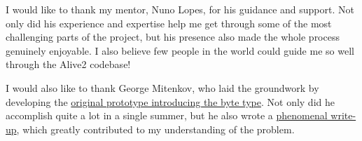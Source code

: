 \documentclass[a4paper,12pt]{article}
\begin{document}
I would like to thank my mentor, Nuno Lopes, for his guidance and support.
Not only did his experience and expertise help me get through some of the most challenging parts of the project, but his presence also made the whole process genuinely enjoyable.
I also believe few people in the world could guide me so well through the Alive2 codebase!

I would also like to thank George Mitenkov, who laid the groundwork by developing the \href{https://github.com/georgemitenkov/llvm-project/commits/gsoc2021-dev}{original prototype introducing the byte type}.
Not only did he accomplish quite a lot in a single summer, but he also wrote a \href{https://gist.github.com/georgemitenkov/3def898b8845c2cc161bd216cbbdb81f}{phenomenal write-up}, which greatly contributed to my understanding of the problem.

\normalem

\ULforem
\end{document}
